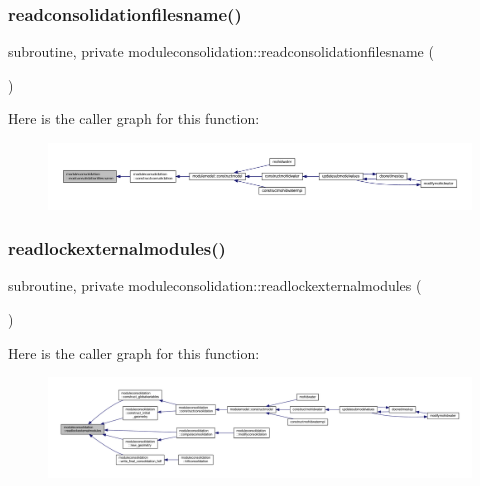 \subsubsection{\texorpdfstring{readconsolidationfilesname()}{readconsolidationfilesname()}}
{\footnotesize\ttfamily subroutine, private moduleconsolidation\+::readconsolidationfilesname (\begin{DoxyParamCaption}{ }\end{DoxyParamCaption})\hspace{0.3cm}{\ttfamily [private]}}

Here is the caller graph for this function\+:\nopagebreak
\begin{figure}[H]
\begin{center}
\leavevmode
\includegraphics[width=350pt]{namespacemoduleconsolidation_adc874bdb2826879904126cec4cd75459_icgraph}
\end{center}
\end{figure}
\mbox{\label{namespacemoduleconsolidation_a5157e525fb069b7984e826def43a4dfc}} 
\subsubsection{\texorpdfstring{readlockexternalmodules()}{readlockexternalmodules()}}
{\footnotesize\ttfamily subroutine, private moduleconsolidation\+::readlockexternalmodules (\begin{DoxyParamCaption}{ }\end{DoxyParamCaption})\hspace{0.3cm}{\ttfamily [private]}}

Here is the caller graph for this function\+:\nopagebreak
\begin{figure}[H]
\begin{center}
\leavevmode
\includegraphics[width=350pt]{namespacemoduleconsolidation_a5157e525fb069b7984e826def43a4dfc_icgraph}
\end{center}
\end{figure}
\mbox{\label{namespacemoduleconsolidation_a146c8502b0f191abd1664acdcd22a4c4}} 
